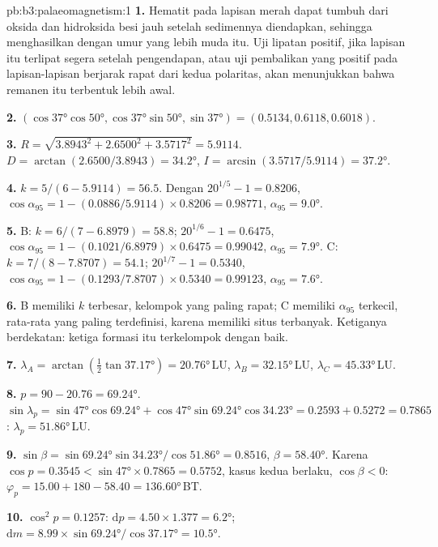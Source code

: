 \begin{solution}{pb:b3:palaeomagnetism:1}
\textbf{1.} Hematit pada lapisan merah dapat tumbuh dari oksida dan hidroksida besi
jauh setelah sedimennya diendapkan, sehingga menghasilkan  dengan umur yang lebih muda itu.
Uji lipatan positif, jika lapisan itu terlipat segera setelah
pengendapan, atau uji pembalikan yang positif pada lapisan-lapisan berjarak rapat dari kedua
polaritas, akan menunjukkan bahwa remanen itu terbentuk lebih awal.

\textbf{2.} $(\cos\ang{37}\cos\ang{50}, \cos\ang{37}\sin\ang{50}, \sin\ang{37})
= (0.5134, 0.6118, 0.6018)$.

\textbf{3.} $R = \sqrt{3.8943^2 + 2.6500^2 + 3.5717^2} = 5.9114$. $D =
\arctan(2.6500/3.8943) = \ang{34.2}$, $I = \arcsin(3.5717/5.9114) = \ang{37.2}$.

\textbf{4.} $k = 5/(6 - 5.9114) = 56.5$. Dengan $20^{1/5} - 1 = 0.8206$,
$\cos\alpha_{95} = 1 - (0.0886/5.9114)\times0.8206 = 0.98771$, $\alpha_{95} =
\ang{9.0}$.

\textbf{5.} B: $k = 6/(7 - 6.8979) = 58.8$; $20^{1/6} - 1 = 0.6475$,
$\cos\alpha_{95} = 1 - (0.1021/6.8979)\times0.6475 = 0.99042$, $\alpha_{95} =
\ang{7.9}$. C: $k = 7/(8 - 7.8707) = 54.1$; $20^{1/7} - 1 = 0.5340$,
$\cos\alpha_{95} = 1 - (0.1293/7.8707)\times0.5340 = 0.99123$, $\alpha_{95} =
\ang{7.6}$.

\textbf{6.} B memiliki $k$ terbesar, kelompok yang paling rapat; C memiliki
$\alpha_{95}$ terkecil, rata-rata yang paling terdefinisi, karena memiliki situs terbanyak. Ketiganya
berdekatan: ketiga formasi itu terkelompok dengan baik.

\textbf{7.} $\lambda_A = \arctan(\tfrac12\tan\ang{37.17}) = \ang{20.76}$\,LU,
$\lambda_B = \ang{32.15}$\,LU, $\lambda_C = \ang{45.33}$\,LU.

\textbf{8.} $p = 90 - 20.76 = \ang{69.24}$. $\sin\lambda_p =
\sin\ang{47}\cos\ang{69.24} + \cos\ang{47}\sin\ang{69.24}\cos\ang{34.23} =
0.2593 + 0.5272 = 0.7865$: $\lambda_p = \ang{51.86}$\,LU.

\textbf{9.} $\sin\beta = \sin\ang{69.24}\sin\ang{34.23}/\cos\ang{51.86} =
0.8516$, $\beta = \ang{58.40}$. Karena $\cos p = 0.3545 < \sin\ang{47}\times
0.7865 = 0.5752$, kasus kedua berlaku, $\cos\beta < 0$:
$\varphi_p = 15.00 + 180 - 58.40 = \ang{136.60}$\,BT.

\textbf{10.} $\cos^2p = 0.1257$: $\mathrm dp = 4.50\times1.377 = \ang{6.2}$;
$\mathrm dm = 8.99\times\sin\ang{69.24}/\cos\ang{37.17} = \ang{10.5}$.


\end{solution}
